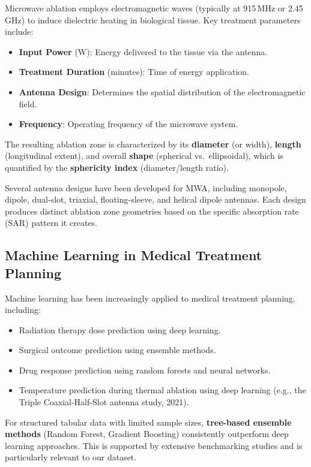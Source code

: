 \documentclass[12pt, a4paper]{article}
\begin{document}
Microwave ablation employs electromagnetic waves (typically at 915\,MHz or 2.45\,GHz) to induce dielectric heating in biological tissue. Key treatment parameters include:

\begin{itemize}
    \item \textbf{Input Power} (W): Energy delivered to the tissue via the antenna.
    \item \textbf{Treatment Duration} (minutes): Time of energy application.
    \item \textbf{Antenna Design}: Determines the spatial distribution of the electromagnetic field.
    \item \textbf{Frequency}: Operating frequency of the microwave system.
\end{itemize}

The resulting ablation zone is characterized by its \textbf{diameter} (or width), \textbf{length} (longitudinal extent), and overall \textbf{shape} (spherical vs.\ ellipsoidal), which is quantified by the \textbf{sphericity index} (diameter/length ratio).

Several antenna designs have been developed for MWA, including monopole, dipole, dual-slot, triaxial, floating-sleeve, and helical dipole antennas. Each design produces distinct ablation zone geometries based on the specific absorption rate (SAR) pattern it creates.

\subsection{Machine Learning in Medical Treatment Planning}
\label{sec:ml-medical}

Machine learning has been increasingly applied to medical treatment planning, including:

\begin{itemize}
    \item Radiation therapy dose prediction using deep learning.
    \item Surgical outcome prediction using ensemble methods.
    \item Drug response prediction using random forests and neural networks.
    \item Temperature prediction during thermal ablation using deep learning (e.g., the Triple Coaxial-Half-Slot antenna study, 2021).
\end{itemize}

For structured tabular data with limited sample sizes, \textbf{tree-based ensemble methods} (Random Forest, Gradient Boosting) consistently outperform deep learning approaches. This is supported by extensive benchmarking studies and is particularly relevant to our dataset.
\end{document}
